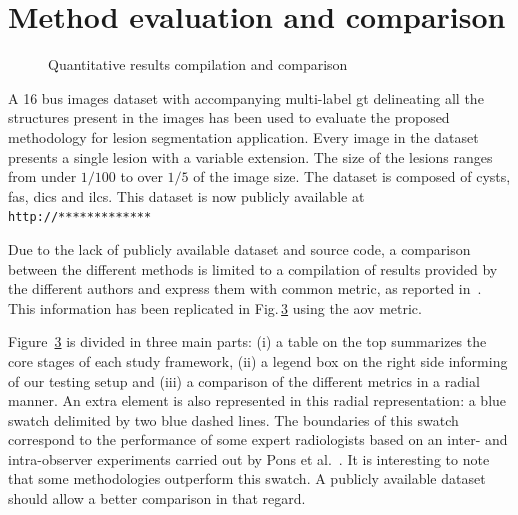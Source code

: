 \section{Method evaluation and comparison} 

\begin{figure}[t]
  \begin{subfigure}[b]{\textwidth}
    {\tiny }
    \label{fig:surveyResults:survey}
  \end{subfigure}
  \begin{subfigure}[b]{\textwidth}
    {\tiny  }
    \label{fig:surveyResults:comparison}
  \end{subfigure}
  \caption{Quantitative results compilation and comparison}
  \label{fig:surveyResults}
\end{figure}

A 16 \ac{bus} images dataset with accompanying multi-label \ac{gt} delineating all the structures present in the images has been used to evaluate the proposed methodology for lesion segmentation application.
Every image in the dataset presents a single lesion with a variable extension. 
The size of the lesions ranges from under $1/100$ to over $1/5$ of the image size.
The dataset is composed of cysts, \acp{fa}, \acp{dic} and \acp{ilc}. This dataset is now publicly available at \texttt{http://*************}

Due to the lack of publicly available dataset and source code, a comparison between the
different methods is limited to a compilation of results provided
by the different authors and express them with common metric, as reported in~\cite{massich2013phd}.
This information has been replicated in Fig.\,\ref{fig:surveyResults} using the \ac{aov} metric.

Figure~\ref{fig:surveyResults} is divided in three main parts: (i) a table on the top summarizes the core stages of each study framework, (ii) a legend box on the right side informing of our testing setup and (iii) a comparison of the different metrics in a radial manner. An extra element is also represented in this radial representation: a blue swatch delimited by two blue dashed lines. The boundaries of this swatch correspond to the performance of some expert radiologists based on an inter- and intra-observer experiments carried out by Pons et al.~\cite{gerard2013}.
It is interesting to note that some methodologies outperform this swatch.
A publicly available dataset should allow a better comparison in that regard.


